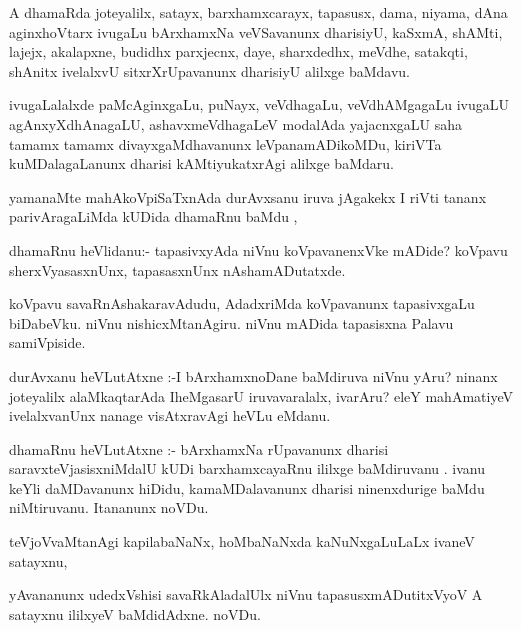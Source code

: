 \documentclass{article}
\begin{document}
\begin{mn}
A dhamaRda joteyalilx, satayx, barxhamxcarayx, tapasusx, dama, niyama, 
dAna aginxhoVtarx ivugaLu bArxhamxNa veVSavanunx dharisiyU, kaSxmA, shAMti, 
lajejx, akalapxne, budidhx parxjecnx, daye, sharxdedhx, meVdhe, satakqti, 
shAnitx ivelalxvU sitxrXrUpavanunx dharisiyU alilxge baMdavu.
\end{mn}

\begin{mn}
ivugaLalalxde paMcAginxgaLu, puNayx, veVdhagaLu, veVdhAMgagaLu ivugaLU 
agAnxyXdhAnagaLU, ashavxmeVdhagaLeV modalAda yajacnxgaLU saha tamamx tamamx 
divayxgaMdhavanunx leVpanamADikoMDu, kiriVTa kuMDalagaLanunx dharisi 
kAMtiyukatxrAgi alilxge baMdaru.
\end{mn}

\begin{mn}
yamanaMte mahAkoVpiSaTxnAda durAvxsanu iruva jAgakekx I riVti tananx parivAragaLiMda 
kUDida  dhamaRnu baMdu , 
\end{mn}

\begin{mn}
dhamaRnu heVlidanu:- tapasivxyAda niVnu koVpavanenxVke mADide?  koVpavu 
sherxVyasasxnUnx, tapasasxnUnx nAshamADutatxde.
\end{mn}

\begin{mn}
koVpavu savaRnAshakaravAdudu, AdadxriMda koVpavanunx tapasivxgaLu biDabeVku. 
niVnu nishicxMtanAgiru. niVnu mADida tapasisxna Palavu samiVpiside.
\end{mn}

\begin{mn}
durAvxanu heVLutAtxne :-I bArxhamxnoDane baMdiruva niVnu yAru? ninanx joteyalilx 
alaMkaqtarAda IheMgasarU iruvavaralalx, ivarAru? eleY mahAmatiyeV ivelalxvanUnx 
nanage visAtxravAgi heVLu eMdanu.
\end{mn}

\begin{mn}
 dhamaRnu heVLutAtxne :- bArxhamxNa rUpavanunx dharisi saravxteVjasisxniMdalU 
 kUDi barxhamxcayaRnu ililxge baMdiruvanu . ivanu keYli daMDavanunx hiDidu, 
 kamaMDalavanunx dharisi ninenxdurige baMdu niMtiruvanu. Itananunx noVDu.
\end{mn}

\begin{mn}
teVjoVvaMtanAgi kapilabaNaNx, hoMbaNaNxda kaNuNxgaLuLaLx ivaneV satayxnu,
\end{mn}

\begin{mn}
yAvananunx udedxVshisi savaRkAladalUlx niVnu tapasusxmADutitxVyoV A satayxnu 
ililxyeV baMdidAdxne. noVDu.
\end{mn}
\end{document}
